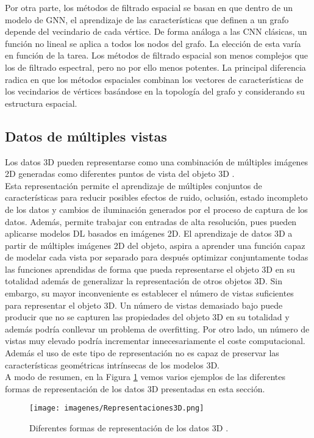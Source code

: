 Por otra parte, los métodos de filtrado espacial se basan en que dentro de un modelo de GNN, el aprendizaje de las características que definen a un grafo depende del vecindario de cada vértice. De forma análoga a las CNN clásicas, un función no lineal se aplica a todos los nodos del grafo. La elección de esta varía en función de la tarea. Los métodos de filtrado espacial son menos complejos que los de filtrado espectral, pero no por ello menos potentes. La principal diferencia radica en que los métodos espaciales combinan los vectores de características de los vecindarios de vértices basándose en la topología del grafo y considerando su estructura espacial.


\subsection{Datos de múltiples vistas}
Los datos 3D pueden representarse como una combinación de múltiples imágenes 2D generadas como diferentes puntos de vista del objeto 3D \cite{zhao2017multi}. 
\\

Esta representación permite el aprendizaje de múltiples conjuntos de características para reducir posibles efectos de ruido, oclusión, estado incompleto de los datos y cambios de iluminación generados por el proceso de captura de los datos. Además, permite trabajar con entradas de alta resolución, pues pueden aplicarse modelos DL basados en imágenes 2D. El aprendizaje de datos 3D a partir de múltiples imágenes 2D del objeto, aspira a aprender una función capaz de modelar cada vista por separado para después optimizar conjuntamente todas las funciones aprendidas de forma que pueda representarse el objeto 3D en su totalidad además de generalizar la representación de otros objetos 3D. Sin embargo, su mayor inconveniente es establecer el número de vistas suficientes para representar el objeto 3D. Un número de vistas demasiado bajo puede producir que no se capturen las propiedades del objeto 3D en su totalidad y además podría conllevar un problema de overfitting. Por otro lado, un número de vistas muy elevado podría incrementar innecesariamente el coste computacional. Además el uso de este tipo de representación no es capaz de preservar las características geométricas intrínsecas de los modelos 3D.\\

A modo de resumen, en la Figura \ref{fig:rep3D} vemos varios ejemplos de las diferentes formas de representación de los datos 3D presentadas en esta sección.

\newpage

\begin{figure}[ht!]
    \centering
    \texttt{[image: imagenes/Representaciones3D.png]}
    \caption[Diferentes formas de representación de los datos 3D.]{Diferentes formas de representación de los datos 3D \cite{gezawa2020review}.}
    \label{fig:rep3D}
\end{figure}